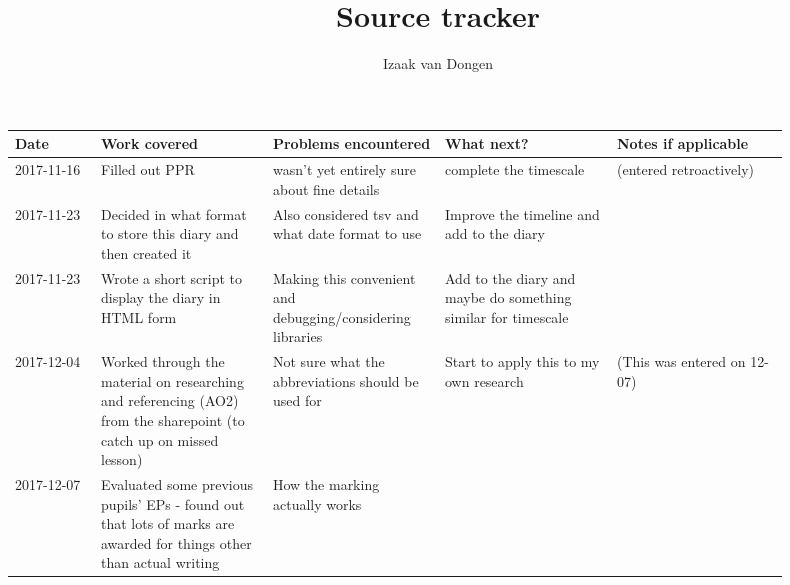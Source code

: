 \documentclass{article}
\title{Source tracker}
\author{Izaak van Dongen}
\begin{document}
    \maketitle

    \begin{center}
    {
    \renewcommand{\arraystretch}{2.0}
    \begin{longtable}{p{0.1\linewidth} p{0.2\linewidth} p{0.2\linewidth} p{0.2\linewidth} p{0.2\linewidth}} \toprule

    Date & Work covered & Problems encountered & What next? & Notes if applicable \\ \midrule

    2017-11-16 &

    Filled out PPR &

    wasn't yet entirely sure about fine details &

    complete the timescale &

    (entered retroactively) \\ 2017-11-23 &

    Decided in what format to store this diary and then created it &

    Also considered tsv and what date format to use &

    Improve the timeline and add to the diary &

    \\ 2017-11-23 &

    Wrote a short script to display the diary in HTML form &

    Making this convenient and debugging/considering libraries &

    Add to the diary and maybe do something similar for timescale &

    \\ 2017-12-04 &

    Worked through the material on researching and referencing (AO2) from the
    sharepoint (to catch up on missed lesson) &

    Not sure what the abbreviations should be used for &

    Start to apply this to my own research &

    (This was entered on 12-07) \\ 2017-12-07 &

    Evaluated some previous pupils' EPs - found out that lots of marks are
    awarded for things other than actual writing &

    How the marking actually works &


\end{longtable}}
\end{center}
\end{document}

